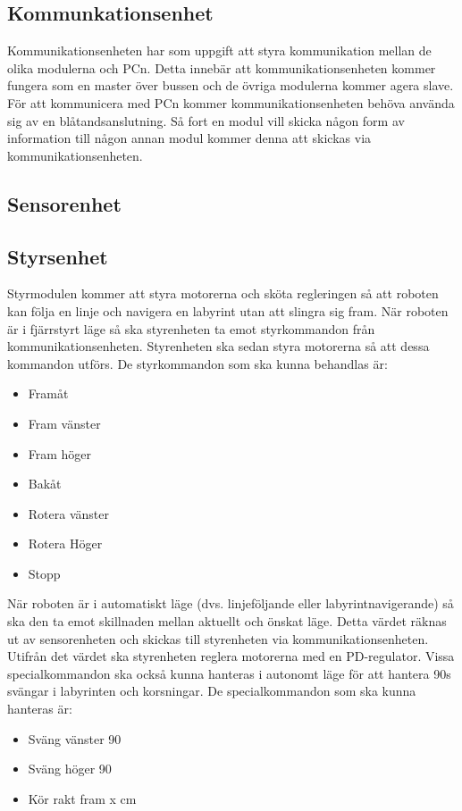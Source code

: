 \documentclass[a4paper,12pt]{article}
\begin{document}
\subsection{Kommunkationsenhet}
Kommunikationsenheten har som uppgift att styra kommunikation mellan de olika
modulerna och PCn. Detta innebär att kommunikationsenheten kommer fungera som en
master över bussen och de övriga modulerna kommer agera slave. För att
kommunicera med PCn kommer kommunikationsenheten behöva använda sig av en
blåtandsanslutning. Så fort en modul vill skicka någon form av information till
någon annan modul kommer denna att skickas via kommunikationsenheten.

\subsection{Sensorenhet}
\subsection{Styrsenhet}
Styrmodulen kommer att styra motorerna och sköta regleringen så att roboten kan följa en linje och navigera en labyrint utan att slingra sig fram.
När roboten är i fjärrstyrt läge så ska styrenheten ta emot styrkommandon från kommunikationsenheten.
Styrenheten ska sedan styra motorerna så att dessa kommandon utförs. De styrkommandon som ska kunna behandlas är:
\begin{itemize}
        \item Framåt
        \item Fram vänster
        \item Fram höger
        \item Bakåt
        \item Rotera vänster
        \item Rotera Höger
        \item Stopp
\end{itemize}

När roboten är i automatiskt läge (dvs. linjeföljande eller labyrintnavigerande) så ska den ta emot skillnaden mellan aktuellt och önskat läge.
Detta värdet räknas ut av sensorenheten och skickas till styrenheten via kommunikationsenheten.
Utifrån det värdet ska styrenheten reglera motorerna med en PD-regulator. Vissa specialkommandon ska också kunna hanteras i autonomt läge 
för att hantera 90\degree s svängar i labyrinten och korsningar. De specialkommandon som ska kunna hanteras är:
\begin{itemize}
        \item Sväng vänster 90\degree
        \item Sväng höger 90\degree
        \item Kör rakt fram x cm
\end{itemize}
\end{document}
